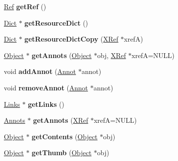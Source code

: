 \begin{DoxyCompactItemize}
\item 
\mbox{\label{class_page_afdd587ad5cab32fb3c7e5e0ba0736449}} 
\hyperlink{struct_ref}{Ref} {\bfseries get\+Ref} ()
\item 
\mbox{\label{class_page_a3b8b2bdb225de34f3e1804f7c46a947d}} 
\hyperlink{class_dict}{Dict} $\ast$ {\bfseries get\+Resource\+Dict} ()
\item 
\mbox{\label{class_page_ab8d4eb7574d1e1a9bc9951b94c80901f}} 
\hyperlink{class_dict}{Dict} $\ast$ {\bfseries get\+Resource\+Dict\+Copy} (\hyperlink{class_x_ref}{X\+Ref} $\ast$xrefA)
\item 
\mbox{\label{class_page_a80c60061d412308fdabba453b3c437fe}} 
\hyperlink{class_object}{Object} $\ast$ {\bfseries get\+Annots} (\hyperlink{class_object}{Object} $\ast$obj, \hyperlink{class_x_ref}{X\+Ref} $\ast$xrefA=N\+U\+LL)
\item 
\mbox{\label{class_page_a1766b47252696d6c6fcc6bc986b73a87}} 
void {\bfseries add\+Annot} (\hyperlink{class_annot}{Annot} $\ast$annot)
\item 
\mbox{\label{class_page_ac74937509ccb7d3d8736f9a674a7765b}} 
void {\bfseries remove\+Annot} (\hyperlink{class_annot}{Annot} $\ast$annot)
\item 
\mbox{\label{class_page_ab7358bebfdf778a92908df1c5d40d91d}} 
\hyperlink{class_links}{Links} $\ast$ {\bfseries get\+Links} ()
\item 
\mbox{\label{class_page_a7a893f1a224b59f7b9b5ba08127087b3}} 
\hyperlink{class_annots}{Annots} $\ast$ {\bfseries get\+Annots} (\hyperlink{class_x_ref}{X\+Ref} $\ast$xrefA=N\+U\+LL)
\item 
\mbox{\label{class_page_a8f2db7f46d4bf46cf16731397dfe1bfe}} 
\hyperlink{class_object}{Object} $\ast$ {\bfseries get\+Contents} (\hyperlink{class_object}{Object} $\ast$obj)
\item 
\mbox{\label{class_page_af74db77a845217e97238eba2c9695a10}} 
\hyperlink{class_object}{Object} $\ast$ {\bfseries get\+Thumb} (\hyperlink{class_object}{Object} $\ast$obj)

\end{DoxyCompactItemize}
